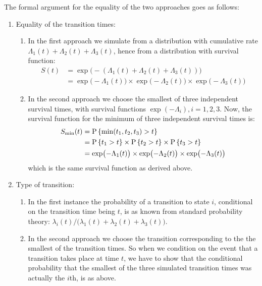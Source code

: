 \documentclass[a4paper,twoside,12pt]{report}
\providecommand{\pmat}[1]{\text{\rm P}\left\{#1\right\}}
\begin{document}
The formal argument for the equality of the two approaches goes as
follows:
\begin{enumerate}
\item Equality of the transition times:
  \begin{enumerate}
  \item In the first approach we simulate from a distribution with
    cumulative rate $\Lambda_1(t)+\Lambda_2(t)+\Lambda_3(t)$, hence
    from a distribution with survival function:
    \begin{align*}
    S(t) & = \exp\bigl(-(\Lambda_1(t)+\Lambda_2(t)+\Lambda_3(t))\bigr) \\
         & = \exp\bigl(-\Lambda_1(t)\bigr)\times
             \exp\bigl(-\Lambda_2(t)\bigr)\times
             \exp\bigl(-\Lambda_3(t)\bigr)
    \end{align*}
  \item In the second approach we choose the smallest of three
    independent survival times, with survival functions
    $\exp(-\Lambda_i), i=1,2,3$. Now, the survival function for the
    minimum of three independent survival times is:
    \begin{align*}
      S_\text{min}(t) & = \pmat{\min(t_1,t_2,t_3)>t} \\
                     & = \pmat{t_1>t} \times
                         \pmat{t_2>t} \times
                         \pmat{t_3>t} \\
                     & = \exp\bigl(-\Lambda_1(t)\bigr)\times
                         \exp\bigl(-\Lambda_2(t)\bigr)\times
                         \exp\bigl(-\Lambda_3(t)\bigr)
    \end{align*}
    which is the same survival function as derived above.
  \end{enumerate}
\item Type of transition:
  \begin{enumerate}
  \item In the first instance the probability of a transition to state
    $i$, conditional on the transition time being $t$, is as known
    from standard probability theory:
    $\lambda_i(t)/\bigl(\lambda_1(t)+\lambda_2(t)+\lambda_3(t)\bigr)$.
  \item In the second approach we choose the transition corresponding
    to the the smallest of the transition times. So when we condition
    on the event that a transition takes place at time $t$, we have to
    show that the conditional probability that the smallest of the
    three simulated transition times was actually the $i$th, is as above.


\end{enumerate}
\end{enumerate}
\end{document}
